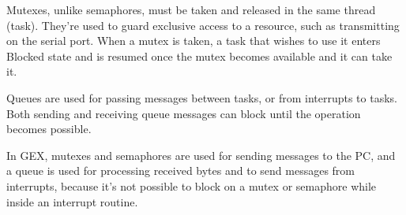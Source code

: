Mutexes, unlike semaphores, must be taken and released in the same thread (task). They're used to guard exclusive access to a resource, such as transmitting on the serial port. When a mutex is taken, a task that wishes to use it enters Blocked state and is resumed once the mutex becomes available and it can take it.

Queues are used for passing messages between tasks, or from interrupts to tasks. Both sending and receiving queue messages can block until the operation becomes possible. 

In GEX, mutexes and semaphores are used for sending messages to the \gls{PC}, and a queue is used for processing received bytes and to send messages from interrupts, because it's not possible to block on a mutex or semaphore while inside an interrupt routine.


